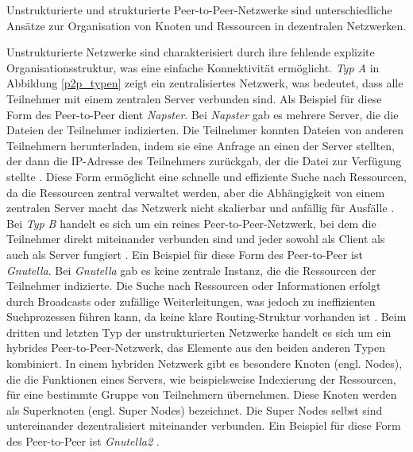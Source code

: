 \noindent Unstrukturierte und strukturierte Peer-to-Peer-Netzwerke sind unterschiedliche Ansätze zur Organisation von Knoten und Ressourcen in dezentralen Netzwerken.

Unstrukturierte Netzwerke sind charakterisiert durch ihre fehlende explizite Organisationsstruktur, was eine einfache Konnektivität ermöglicht. \textit{Typ A} in Abbildung \ref{p2p_typen} zeigt ein zentralisiertes Netzwerk, was bedeutet, dass alle Teilnehmer mit einem zentralen Server verbunden sind. Als Beispiel für diese Form des Peer-to-Peer dient \textit{Napster}. Bei \textit{Napster} gab es mehrere Server, die die Dateien der Teilnehmer indizierten. Die Teilnehmer konnten Dateien von anderen Teilnehmern herunterladen, indem sie eine Anfrage an einen der Server stellten, der dann die IP-Adresse des Teilnehmers zurückgab, der die Datei zur Verfügung stellte \parencite[S. 171]{Saroiu_MeasuringAndAnalyzingNapsterAndGnutellaHosts}. Diese Form ermöglicht eine schnelle und effiziente Suche nach Ressourcen, da die Ressourcen zentral verwaltet werden, aber die Abhängigkeit von einem zentralen Server macht das Netzwerk nicht skalierbar und anfällig für Ausfälle \parencite[S. 732]{Khatibi_StructuredUnstructuredP2P}.
Bei \textit{Typ B} handelt es sich um ein reines Peer-to-Peer-Netzwerk, bei dem die Teilnehmer direkt miteinander verbunden sind und jeder sowohl als Client als auch als Server fungiert \parencite[S. 732]{Khatibi_StructuredUnstructuredP2P}. Ein Beispiel für diese Form des Peer-to-Peer ist \textit{Gnutella}. Bei \textit{Gnutella} gab es keine zentrale Instanz, die die Ressourcen der Teilnehmer indizierte. Die Suche nach Ressourcen oder Informationen erfolgt durch Broadcasts oder zufällige Weiterleitungen, was jedoch zu ineffizienten Suchprozessen führen kann, da keine klare Routing-Struktur vorhanden ist \parencite[S. 171]{Saroiu_MeasuringAndAnalyzingNapsterAndGnutellaHosts}. Beim dritten und letzten Typ der unstrukturierten Netzwerke handelt es sich um ein hybrides Peer-to-Peer-Netzwerk, das Elemente aus den beiden anderen Typen kombiniert. In einem hybriden Netzwerk gibt es besondere Knoten (engl. Nodes), die die Funktionen eines Servers, wie beispielsweise Indexierung der Ressourcen, für eine bestimmte Gruppe von Teilnehmern übernehmen. Diese Knoten werden als Superknoten (engl. Super Nodes) bezeichnet. Die Super Nodes selbst sind untereinander dezentralisiert miteinander verbunden. Ein Beispiel für diese Form des Peer-to-Peer ist \textit{Gnutella2} \parencite[S. 732]{Khatibi_StructuredUnstructuredP2P}. 

